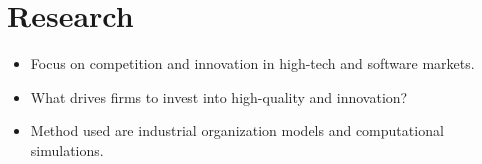 \documentclass[a4paper,12pt]{article}
\begin{document}

\section{Research}

\vspace{1em}

\begin{itemize}[noitemsep]
	\item Focus on competition and innovation in high-tech and software markets.
	\item What drives firms to invest into high-quality and innovation?
	\item Method used are industrial organization models and computational simulations.
\end{itemize}

	
\vfill
\end{document}
